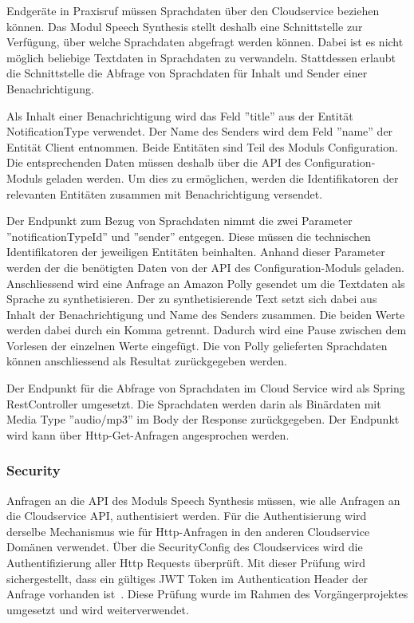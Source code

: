Endgeräte in Praxisruf müssen Sprachdaten über den Cloudservice beziehen können.
Das Modul Speech Synthesis stellt deshalb eine Schnittstelle zur Verfügung, über welche Sprachdaten abgefragt werden können.
Dabei ist es nicht möglich beliebige Textdaten in Sprachdaten zu verwandeln.
Stattdessen erlaubt die Schnittstelle die Abfrage von Sprachdaten für Inhalt und Sender einer Benachrichtigung.

Als Inhalt einer Benachrichtigung wird das Feld ''title'' aus der Entität NotificationType verwendet.
Der Name des Senders wird dem Feld ''name'' der Entität Client entnommen.
Beide Entitäten sind Teil des Moduls Configuration.
Die entsprechenden Daten müssen deshalb über die API des Configuration-Moduls geladen werden.
Um dies zu ermöglichen, werden die Identifikatoren der relevanten Entitäten zusammen mit Benachrichtigung versendet.

Der Endpunkt zum Bezug von Sprachdaten nimmt die zwei Parameter ''notificationTypeId'' und ''sender'' entgegen.
Diese müssen die technischen Identifikatoren der jeweiligen Entitäten beinhalten.
Anhand dieser Parameter werden der die benötigten Daten von der API des Configuration-Moduls geladen.
Anschliessend wird eine Anfrage an Amazon Polly gesendet um die Textdaten als Sprache zu synthetisieren.
Der zu synthetisierende Text setzt sich dabei aus Inhalt der Benachrichtigung und Name des Senders zusammen.
Die beiden Werte werden dabei durch ein Komma getrennt.
Dadurch wird eine Pause zwischen dem Vorlesen der einzelnen Werte eingefügt.
Die von Polly gelieferten Sprachdaten können anschliessend als Resultat zurückgegeben werden.

Der Endpunkt für die Abfrage von Sprachdaten im Cloud Service wird als Spring RestController umgesetzt.
Die Sprachdaten werden darin als Binärdaten mit Media Type ''audio/mp3'' im Body der Response zurückgegeben.
Der Endpunkt wird kann über Http-Get-Anfragen angesprochen werden.

\subsubsection{Security}

Anfragen an die API des Moduls Speech Synthesis müssen, wie alle Anfragen an die Cloudservice API, authentisiert werden.
Für die Authentisierung wird derselbe Mechanismus wie für Http-Anfragen in den anderen Cloudservice Domänen verwendet.
Über die SecurityConfig des Cloudservices wird die Authentifizierung aller Http Requests überprüft.
Mit dieser Prüfung wird sichergestellt, dass ein gültiges JWT Token im Authentication Header der Anfrage vorhanden ist~\cite{ip5}.
Diese Prüfung wurde im Rahmen des Vorgängerprojektes umgesetzt und wird weiterverwendet.

